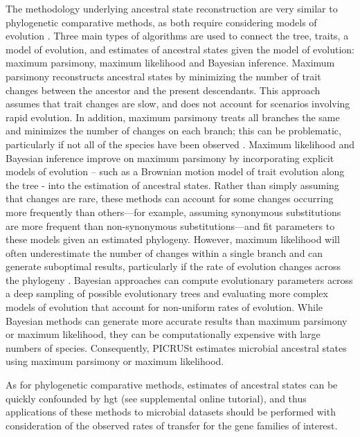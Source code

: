 The methodology underlying ancestral state reconstruction are very similar to phylogenetic comparative methods, as both require considering models of evolution \cite{ancestral_character_states}. Three main types of algorithms are used to connect the tree, traits, a model of evolution, and estimates of ancestral states given the model of evolution: maximum parsimony, maximum likelihood and Bayesian inference\cite{ancestral_character_states}. Maximum parsimony reconstructs ancestral states by minimizing the number of trait changes between the ancestor and the present descendants. This approach assumes that trait changes are slow, and does not account for scenarios involving rapid evolution. In addition, maximum parsimony treats all branches the same and minimizes the number of changes on each branch; this can be problematic, particularly if not all of the species have been observed \cite{ancestral_reconstruction}. Maximum likelihood and Bayesian inference improve on maximum parsimony by incorporating explicit models of evolution – such as a Brownian motion model of trait evolution along the tree - into the estimation of ancestral states. Rather than simply assuming that changes are rare, these methods can account for some changes occurring more frequently than others—for example, assuming synonymous substitutions are more frequent than non-synonymous substitutions—and fit parameters to these models given an estimated phylogeny.  However, maximum likelihood will often underestimate the number of changes within a single branch and can generate suboptimal results, particularly if the rate of evolution changes across the phylogeny \cite{simulation_comparison}. Bayesian approaches can compute evolutionary parameters across a deep sampling of possible evolutionary trees and evaluating more complex models of evolution that account for non-uniform rates of evolution. While Bayesian methods can generate more accurate results than maximum parsimony or maximum likelihood, they can be computationally expensive with large numbers of species.  Consequently, PICRUSt estimates microbial ancestral states using maximum parsimony or maximum likelihood. \par
As for phylogenetic comparative methods, estimates of ancestral states can be quickly confounded by \gls{hgt} (see supplemental online tutorial), and thus applications of these methods to microbial datasets should be performed with consideration of the observed rates of transfer for the gene families of interest.

